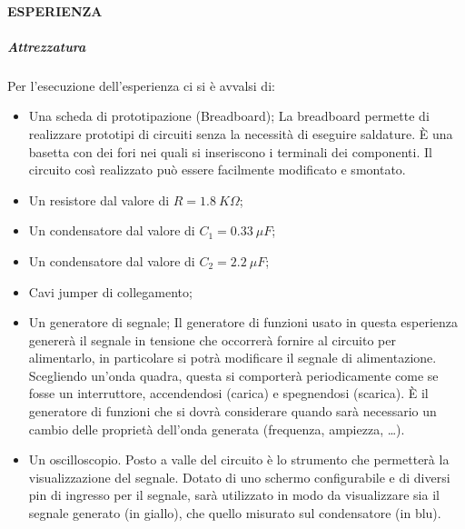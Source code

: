 \documentclass[a4paper, 12pt, twoside]{report}
\begin{document}
{\paragraph {ESPERIENZA}	
\subparagraph{Attrezzatura} \mbox{} \newline

Per l'esecuzione dell'esperienza ci si è avvalsi di:
\begin{itemize}
	\item Una scheda di prototipazione (Breadboard); \newline
	 La breadboard permette di realizzare prototipi di circuiti senza la necessità di eseguire saldature. È una basetta con dei fori nei quali si inseriscono i terminali dei componenti. Il circuito così realizzato può essere facilmente modificato e smontato.
	\item Un resistore dal valore di $R=1.8 ~K\Omega$; 
	\item Un condensatore dal valore di $C_{1}=0.33 ~\mu F$;
	\item Un condensatore dal valore di $C_{2}=2.2 ~\mu F$;
	\item Cavi jumper di collegamento;
	\item Un generatore di segnale; \newline
	Il generatore di funzioni usato in questa esperienza genererà il segnale in tensione che occorrerà fornire al circuito per alimentarlo, in particolare si potrà modificare il segnale di alimentazione. \newline
	Scegliendo un'onda quadra, questa si comporterà periodicamente come se fosse un interruttore, accendendosi (carica) e spegnendosi (scarica). \newline 
	È il generatore di funzioni che si dovrà considerare quando sarà necessario un cambio delle proprietà dell'onda generata (frequenza, ampiezza, \dots ).
	\item Un oscilloscopio. \newline
	Posto a valle del circuito è lo strumento che permetterà la visualizzazione del segnale. Dotato di uno schermo configurabile e di diversi pin di ingresso per il segnale, sarà utilizzato in modo da visualizzare sia il segnale generato (in giallo), che quello misurato sul condensatore (in blu).
\end{itemize}

}
\end{document}
